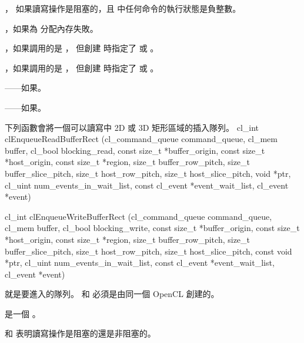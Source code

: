 \item {}，
  如果讀寫操作是阻塞的，且  中任何命令的執行狀態是負整數。

\item {}，如果為  分配內存失敗。

\item {}，如果調用的是 ，
  但創建  時指定了  或 。

\item {}，如果調用的是 ，
  但創建  時指定了  或 。

\item {}——如果\scdevfailres。
\item {}——如果\schostfailres。
\stopigBase

下列函數會將一個可以讀寫中 2D 或 3D 矩形區域的插入隊列。
\startclc
cl_int clEnqueueReadBufferRect (cl_command_queue command_queue,
			cl_mem buffer,
			cl_bool blocking_read,
			const size_t *buffer_origin,
			const size_t *host_origin,
			const size_t *region,
			size_t buffer_row_pitch,
			size_t buffer_slice_pitch,
			size_t host_row_pitch,
			size_t host_slice_pitch,
			void *ptr,
			cl_uint num_events_in_wait_list,
			const cl_event *event_wait_list,
			cl_event *event)

cl_int clEnqueueWriteBufferRect (cl_command_queue command_queue,
			cl_mem buffer,
			cl_bool blocking_write,
			const size_t *buffer_origin,
			const size_t *host_origin,
			const size_t *region,
			size_t buffer_row_pitch,
			size_t buffer_slice_pitch,
			size_t host_row_pitch,
			size_t host_slice_pitch,
			const void *ptr,
			cl_uint num_events_in_wait_list,
			const cl_event *event_wait_list,
			cl_event *event)
\stopclc

 就是要進入的隊列。
 和  必須是由同一個 OpenCL 創建的。

 是一個 。

 和  表明讀寫操作是{\ftRef 阻塞}的還是{\ftRef 非阻塞}的。

